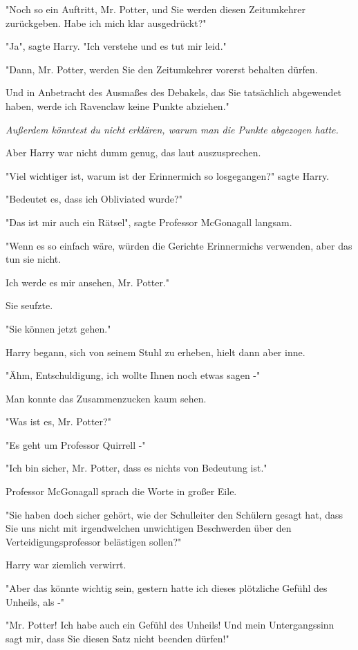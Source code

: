 {"Noch so ein Auftritt, Mr. Potter, und Sie werden diesen Zeitumkehrer zurückgeben. Habe ich mich klar ausgedrückt?"

"Ja", sagte Harry. "Ich verstehe und es tut mir leid."

"Dann, Mr. Potter, werden Sie den Zeitumkehrer vorerst behalten dürfen.

Und in Anbetracht des Ausmaßes des Debakels, das Sie tatsächlich abgewendet haben, werde ich Ravenclaw keine Punkte abziehen."

\emph{Außerdem könntest du nicht erklären, warum man die Punkte abgezogen hatte.}

Aber Harry war nicht dumm genug, das laut auszusprechen.

"Viel wichtiger ist, warum ist der Erinnermich so losgegangen?" sagte Harry.

"Bedeutet es, dass ich Obliviated wurde?"

"Das ist mir auch ein Rätsel", sagte Professor McGonagall langsam.

"Wenn es so einfach wäre, würden die Gerichte Erinnermichs verwenden, aber das tun sie nicht.

Ich werde es mir ansehen, Mr. Potter."

Sie seufzte.

"Sie können jetzt gehen."

Harry begann, sich von seinem Stuhl zu erheben, hielt dann aber inne.

"Ähm, Entschuldigung, ich wollte Ihnen noch etwas sagen -"

Man konnte das Zusammenzucken kaum sehen.

"Was ist es, Mr. Potter?"

"Es geht um Professor Quirrell -"

"Ich bin sicher, Mr. Potter, dass es nichts von Bedeutung ist."

Professor McGonagall sprach die Worte in großer Eile.

"Sie haben doch sicher gehört, wie der Schulleiter den Schülern gesagt hat, dass Sie uns nicht mit irgendwelchen unwichtigen Beschwerden über den Verteidigungsprofessor belästigen sollen?"

Harry war ziemlich verwirrt.

"Aber das könnte wichtig sein, gestern hatte ich dieses plötzliche Gefühl des Unheils, als -"

"Mr. Potter! Ich habe auch ein Gefühl des Unheils! Und mein Untergangssinn sagt mir, dass Sie diesen Satz nicht beenden dürfen!"

}
